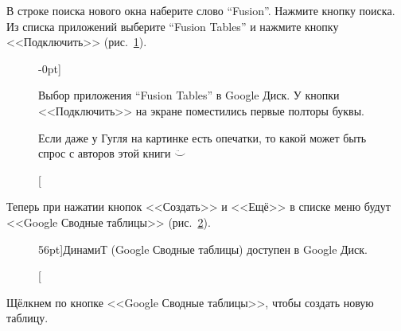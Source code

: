 В строке поиска нового окна наберите слово ``Fusion''. Нажмите кнопку поиска. 
Из списка приложений выберите ``Fusion Tables'' и нажмите кнопку <<Подключить>> 
(рис.~\ref{fig:add_fusion_to_drive}).

\begin{figure}
{%
\setlength{\fboxsep}{0pt}%
\setlength{\fboxrule}{1pt}%
%
}%
    \caption[Выбор приложения в Google Диск.][-0pt]{Выбор приложения 
            ``Fusion Tables'' в Google Диск. У кнопки <<Подключить>> 
            на экране поместились первые полторы буквы.

        { Если даже у Гугля на картинке есть опечатки, то какой может быть 
        спрос с авторов этой книги $\ddot\smile$
        }
    }
  \label{fig:add_fusion_to_drive}
\end{figure}

Теперь при нажатии кнопок <<Создать>> и <<Ещё>> в списке меню будут 
<<Google Сводные таблицы>> (рис.~\ref{fig:fusion_is_available_at_drive}).

\begin{figure}
{%
\setlength{\fboxsep}{0pt}%
\setlength{\fboxrule}{1pt}%
%
}%
    \caption[Google Сводные таблицы доступны в Google Диск.][56pt]{ДинамиТ 
            (Google Сводные таблицы) доступен в Google Диск.
    }
  \label{fig:fusion_is_available_at_drive}
\end{figure}

Щёлкнем по кнопке <<Google Сводные таблицы>>, чтобы создать новую таблицу.
